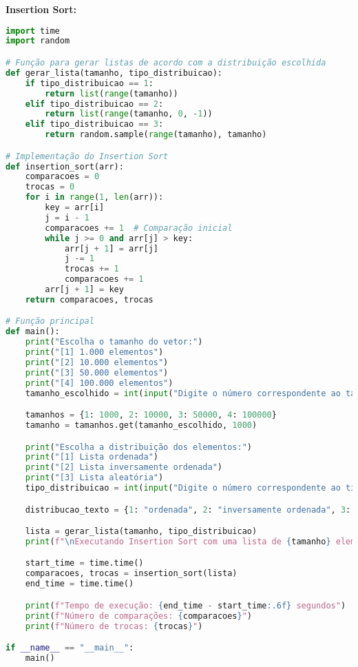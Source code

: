 \documentclass[a4paper,12pt]{article}
\begin{document}
 \textbf{Insertion Sort: } \\
\begin{lstlisting}[language=Python]
import time
import random

# Função para gerar listas de acordo com a distribuição escolhida
def gerar_lista(tamanho, tipo_distribuicao):
    if tipo_distribuicao == 1:
        return list(range(tamanho))
    elif tipo_distribuicao == 2:
        return list(range(tamanho, 0, -1))
    elif tipo_distribuicao == 3:
        return random.sample(range(tamanho), tamanho)

# Implementação do Insertion Sort 
def insertion_sort(arr):
    comparacoes = 0
    trocas = 0
    for i in range(1, len(arr)):
        key = arr[i]
        j = i - 1
        comparacoes += 1  # Comparação inicial
        while j >= 0 and arr[j] > key:
            arr[j + 1] = arr[j]
            j -= 1
            trocas += 1
            comparacoes += 1
        arr[j + 1] = key
    return comparacoes, trocas

# Função principal
def main():
    print("Escolha o tamanho do vetor:")
    print("[1] 1.000 elementos")
    print("[2] 10.000 elementos")
    print("[3] 50.000 elementos")
    print("[4] 100.000 elementos")
    tamanho_escolhido = int(input("Digite o número correspondente ao tamanho do vetor: "))

    tamanhos = {1: 1000, 2: 10000, 3: 50000, 4: 100000}
    tamanho = tamanhos.get(tamanho_escolhido, 1000)

    print("Escolha a distribuição dos elementos:")
    print("[1] Lista ordenada")
    print("[2] Lista inversamente ordenada")
    print("[3] Lista aleatória")
    tipo_distribuicao = int(input("Digite o número correspondente ao tipo de distribuição: "))

    distribucao_texto = {1: "ordenada", 2: "inversamente ordenada", 3: "aleatória"}

    lista = gerar_lista(tamanho, tipo_distribuicao)
    print(f"\nExecutando Insertion Sort com uma lista de {tamanho} elementos ({distribucao_texto[tipo_distribuicao]}).\n")

    start_time = time.time()
    comparacoes, trocas = insertion_sort(lista)
    end_time = time.time()

    print(f"Tempo de execução: {end_time - start_time:.6f} segundos")
    print(f"Número de comparações: {comparacoes}")
    print(f"Número de trocas: {trocas}")

if __name__ == "__main__":
    main()
\end{lstlisting}
\end{document}
